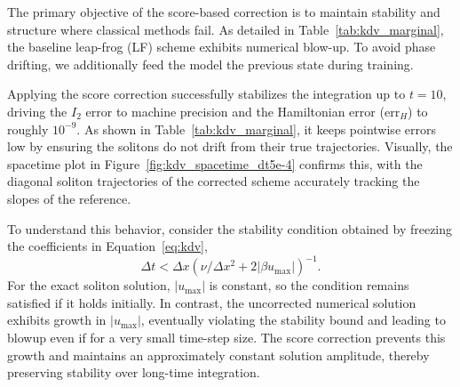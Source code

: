 \documentclass[letterpaper]{article} %
\def\Eqref#1{Equation~\ref{#1}}
\providecommand{\Eqref}[1]{\Cref{#1}}
\begin{document}
% 


The primary objective of the score-based correction is to maintain stability and structure where classical methods fail. As detailed in Table~\ref{tab:kdv_marginal}, the baseline leap-frog (LF) scheme exhibits numerical blow-up.
To avoid phase drifting, we additionally feed the model the previous state during training.

Applying the score correction successfully stabilizes the integration up to $t = 10$, driving the $I_2$ error to machine precision and the Hamiltonian error ($\mathrm{err}_H$) to roughly $10^{-9}$. As shown in Table~\ref{tab:kdv_marginal}, it keeps pointwise errors low by ensuring the solitons do not drift from their true trajectories. Visually, the spacetime plot in Figure~\ref{fig:kdv_spacetime_dt5e-4} confirms this, with the diagonal soliton trajectories of the corrected scheme accurately tracking the slopes of the reference.

To understand this behavior, consider the stability condition obtained by
freezing the coefficients in \Eqref{eq:kdv},
\begin{equation}
\Delta t < {\Delta x}{(\nu/\Delta x^2 + 2|\beta u_{\max}|)^{-1}}.
\end{equation}
For the exact soliton solution, $|u_{\max}|$ is constant, so the condition
remains satisfied if it holds initially. In contrast, the uncorrected
numerical solution exhibits growth in $|u_{\max}|$, eventually violating the
stability bound and leading to blowup even if for a very small time-step size. The score correction prevents this
growth and maintains an approximately constant solution amplitude, thereby
preserving stability over long-time integration.
\end{document}
